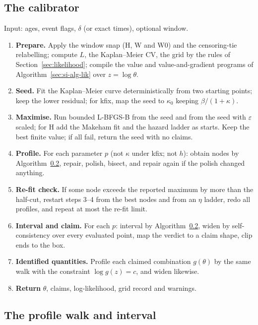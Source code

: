 \subsection{The calibrator}\label{sec:si-alg-cal}

Input: ages, event flags, $\delta$ (or exact times), optional window.
\begin{enumerate}[leftmargin=2em,itemsep=1pt]
  \item \textbf{Prepare.} Apply the window snap (H, W and W0) and the censoring-tie relabelling; compute $L$, the Kaplan--Meier CV, the grid by the rules of Section~\ref{sec:likelihood}; compile the value and value-and-gradient programs of Algorithm~\ref{sec:si-alg-lik} over $z=\log\theta$.
  \item \textbf{Seed.} Fit the Kaplan--Meier curve deterministically from two starting points; keep the lower residual; for kfix, map the seed to $\kappa_0$ keeping $\beta/(1+\kappa)$.
  \item \textbf{Maximise.} Run bounded L-BFGS-B from the seed and from the seed with $\varepsilon$ scaled; for H add the Makeham fit and the hazard ladder as starts. Keep the best finite value; if all fail, return the seed with no claims.
  \item \textbf{Profile.} For each parameter $p$ (not $\kappa$ under kfix; not $h$): obtain nodes by Algorithm~\ref{sec:si-alg-prof}, repair, polish, bisect, and repair again if the polish changed anything.
  \item \textbf{Re-fit check.} If some node exceeds the reported maximum by more than the half-cut, restart steps 3--4 from the best nodes and from an $\eta$ ladder, redo all profiles, and repeat at most the re-fit limit.
  \item \textbf{Interval and claim.} For each $p$: interval by Algorithm~\ref{sec:si-alg-prof}, widen by self-consistency over every evaluated point, map the verdict to a claim shape, clip ends to the box.
  \item \textbf{Identified quantities.} Profile each claimed combination $g(\theta)$ by the same walk with the constraint $\log g(z)=c$, and widen likewise.
  \item \textbf{Return} $\hat\theta$, claims, log-likelihood, grid record and warnings.
\end{enumerate}

\subsection{The profile walk and interval}\label{sec:si-alg-prof}

